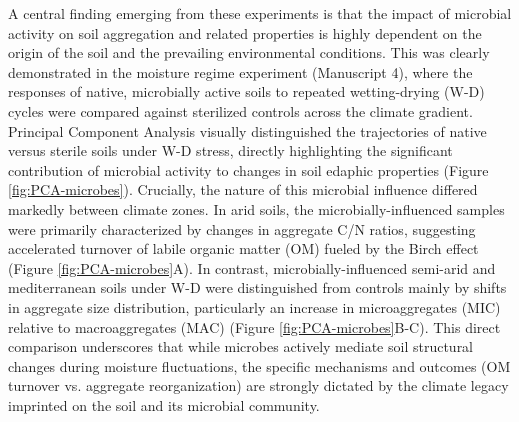 A central finding emerging from these experiments is that the impact of microbial activity on soil aggregation and related properties is highly dependent on the origin of the soil and the prevailing environmental conditions. This was clearly demonstrated in the moisture regime experiment (Manuscript 4), where the responses of native, microbially active soils to repeated wetting-drying (W-D) cycles were compared against sterilized controls across the climate gradient. Principal Component Analysis visually distinguished the trajectories of native versus sterile soils under W-D stress, directly highlighting the significant contribution of microbial activity to changes in soil edaphic properties (Figure \ref{fig:PCA-microbes}). Crucially, the nature of this microbial influence differed markedly between climate zones. In arid soils, the microbially-influenced samples were primarily characterized by changes in aggregate C/N ratios, suggesting accelerated turnover of labile organic matter (OM) fueled by the Birch effect (Figure \ref{fig:PCA-microbes}A). In contrast, microbially-influenced semi-arid and mediterranean soils under W-D were distinguished from controls mainly by shifts in aggregate size distribution, particularly an increase in microaggregates (MIC) relative to macroaggregates (MAC) (Figure \ref{fig:PCA-microbes}B-C). This direct comparison underscores that while microbes actively mediate soil structural changes during moisture fluctuations, the specific mechanisms and outcomes (OM turnover vs. aggregate reorganization) are strongly dictated by the climate legacy imprinted on the soil and its microbial community.


